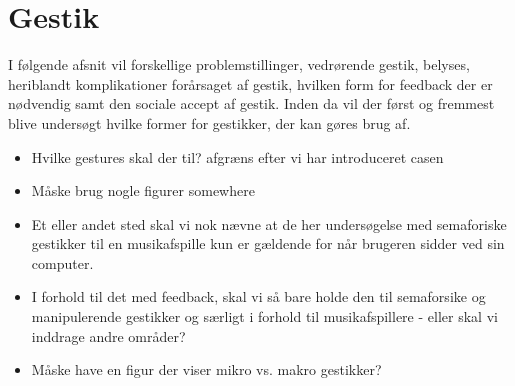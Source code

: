 \section{Gestik}
\label{Gestik}
%
I følgende afsnit vil forskellige problemstillinger, vedrørende gestik, belyses, heriblandt komplikationer forårsaget af gestik, hvilken form for feedback der er nødvendig samt den sociale accept af gestik. Inden da vil der først og fremmest blive undersøgt hvilke former for gestikker, der kan gøres brug af.\blankline  
%
\begin{itemize}
	\item  Hvilke gestures skal der til? afgræns efter vi har introduceret casen
	\item Måske brug nogle figurer somewhere
	\item Et eller andet sted skal vi nok nævne at de her undersøgelse med semaforiske gestikker til en musikafspille kun er gældende for når brugeren sidder ved sin computer. 
	\item I forhold til det med feedback, skal vi så bare holde den til semaforsike og manipulerende gestikker og særligt i forhold til musikafspillere - eller skal vi inddrage andre områder?
	\item Måske have en figur der viser mikro vs. makro gestikker? 
\end{itemize}\blankline
%
